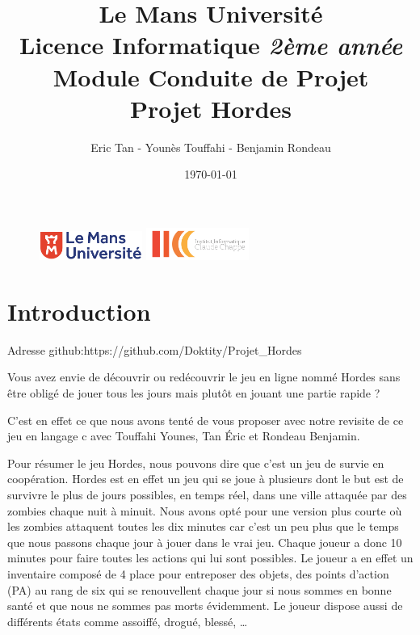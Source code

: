 \documentclass[a4paper,11pt]{article}
\begin{document}
\begin {figure}
\includegraphics[width=0.3\textwidth]{logolemansU.png}
\hspace{150pt}
\includegraphics[width=0.3\textwidth] {logo_ic2.png}
\end {figure}

\title {\textbf {\color {blue} Le Mans Université}\color{black}
\\  Licence Informatique  \textit {2ème année}
\\ Module Conduite de Projet
 \\ \textbf {Projet Hordes}}
\author{Eric Tan - Younès Touffahi - Benjamin Rondeau}
\date{\today}
\maketitle

\newpage

\tableofcontents

\newpage

\section {Introduction}
Adresse github:https://github.com/Doktity/Projet_Hordes
 
Vous avez envie de découvrir ou redécouvrir le jeu en ligne nommé Hordes sans être obligé de jouer tous les jours mais plutôt en jouant une partie rapide ?

C’est en effet ce que nous avons tenté de vous proposer avec notre revisite de ce jeu en langage c avec Touffahi Younes, Tan Éric et Rondeau Benjamin.

Pour résumer le jeu Hordes, nous pouvons dire que c’est un jeu de survie en coopération.
Hordes est en effet un jeu qui se joue à plusieurs dont le but est de survivre le plus de jours possibles, en temps réel, dans une ville attaquée par des zombies chaque nuit à minuit. Nous avons opté pour une version plus courte où les zombies attaquent toutes les dix minutes car c’est un peu plus que le temps que nous passons chaque jour à jouer dans le vrai jeu. Chaque joueur a donc 10 minutes pour faire toutes les actions qui lui sont possibles. Le joueur a en effet un inventaire composé de 4 place pour entreposer des objets, des points d’action (PA) au rang de six qui se renouvellent chaque jour si nous sommes en bonne santé et que nous ne sommes pas morts évidemment. Le joueur dispose aussi de différents états comme assoiffé, drogué, blessé, … 
\end{document}
